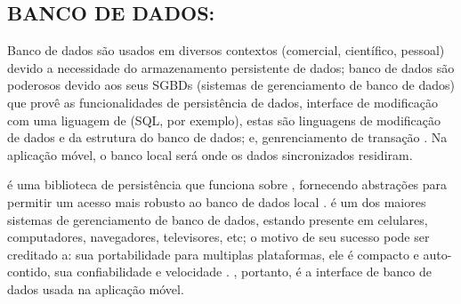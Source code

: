 \subsection{BANCO DE DADOS: }

Banco de dados são usados em diversos contextos (comercial, científico, pessoal) devido a necessidade do armazenamento persistente de dados; banco de dados são poderosos devido aos seus SGBDs (sistemas de gerenciamento de banco de dados) que provê as funcionalidades de persistência de dados, interface de modificação com uma liguagem de  (SQL, por exemplo), estas são linguagens de modificação de dados e da estrutura do banco de dados; e, genrenciamento de transação \cite{GarciaMolinaUllmanWidom2002DatabaseSystems}. Na aplicação móvel, o banco local será onde os dados sincronizados residiram.

 é uma biblioteca de persistência que funciona sobre , fornecendo abstrações para permitir um acesso mais robusto ao banco de dados local \cite{AndroidJetpackRoom}.  é um dos maiores sistemas de gerenciamento de banco de dados, estando presente em celulares, computadores, navegadores, televisores, etc; o motivo de seu sucesso pode ser creditado a: sua portabilidade para multiplas plataformas, ele é compacto e auto-contido, sua confiabilidade e velocidade \cite{GaffneyPrammerBrasfieldHippKennedyPatel2022}. , portanto, é a interface de banco de dados usada na aplicação móvel. 
